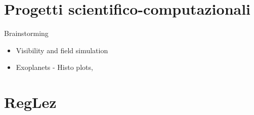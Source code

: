 \documentclass[main.tex]{subfiles}
\begin{document}
\section{Progetti scientifico-computazionali}

\begin{frame}{Brainstorming}
\begin{itemize}
    \item Visibility and field simulation
    \item Exoplanets - Histo plots, 
\end{itemize}
\end{frame}



\section{RegLez}

\end{document}
